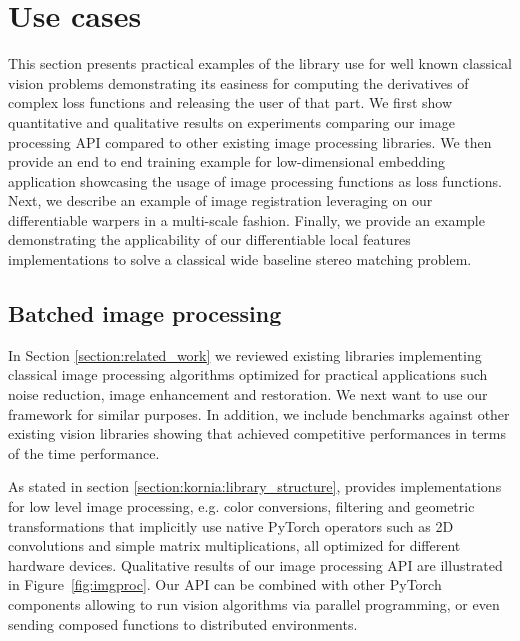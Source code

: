 \section{Use cases}
\label{section:use_cases}
%
This section presents practical examples of the library use for well known classical vision problems demonstrating its easiness for computing the derivatives of complex loss functions and releasing the user of that part. We first show quantitative and qualitative results on experiments comparing our image processing API compared to other existing image processing libraries. We then provide an end to end training example for low-dimensional embedding application showcasing the usage of image processing functions as loss functions. Next, we describe an example of image registration
leveraging on  our differentiable warpers in a multi-scale fashion. Finally, we provide an example demonstrating the applicability of  our differentiable local features implementations to solve a classical wide baseline stereo matching problem.

\subsection{Batched image processing}
\label{section:use_cases:imgproc}

In Section \ref{section:related_work} we reviewed existing libraries implementing classical image processing algorithms optimized for practical applications such noise reduction, image enhancement and restoration. We next  want to use our framework for similar purposes. In addition, we include benchmarks against other existing vision libraries showing that \lib{} achieved competitive performances in terms of the time performance.

As stated in section \ref{section:kornia:library_structure}, \lib{} provides implementations for low level image processing, e.g. color conversions, filtering and geometric   transformations that implicitly use native PyTorch operators such as 2D convolutions and simple matrix multiplications,  all  optimized for different hardware devices. Qualitative results of our image processing API are illustrated in Figure~\ref{fig:imgproc}. Our API can be combined with other PyTorch components allowing to run vision algorithms via parallel programming, or even sending composed functions to distributed environments.

